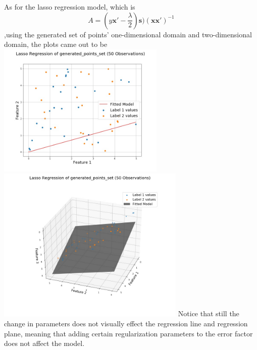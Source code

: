 \documentclass[a4paper,12pt]{IEEEtran}
\begin{document}
As for the lasso regression model, which is $$\textit{A} = (\textit{y}\textbf{x}' - \frac{\lambda}{2})\textbf{s})(\textbf{x}\textbf{x}')^{-1}$$,using the generated set of points' one-dimensional domain and two-dimensional domain, the plots came out to be \includegraphics[width=8cm]{lasso_reg_1d_generated_points_set} \includegraphics[width=9cm]{lasso_reg_2d_generated_points_set} Notice that still the change in parameters does not visually effect the regression line and regression plane, meaning that adding certain regularization parameters to the error factor does not affect the model.
\end{document}
